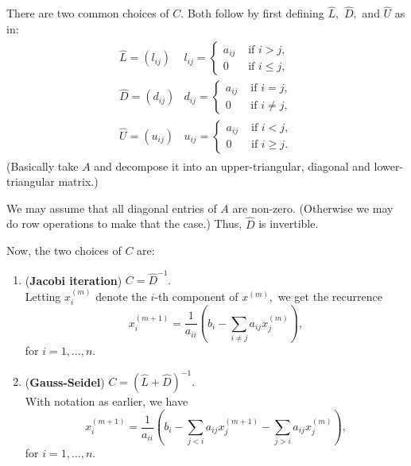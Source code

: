 \documentclass[12pt]{article}
\theoremstyle{definition}
\begin{document}
There are two common choices of $C.$ Both follow by first defining $\hat{L},$ $\hat{D},$ and $\hat{U}$ as in:
\begin{align*} 
	\begin{array}{ll}
		\hat{L} = (l_{ij}) & l_{ij} = \begin{cases}
			a_{ij} & \text{ if } i > j,\\
			0 & \text{ if } i \le j,
		\end{cases}\\
		\hat{D} = (d_{ij}) & d_{ij} = \begin{cases}
			a_{ij} & \text{ if } i = j,\\
			0 & \text{ if } i \neq j,
		\end{cases}\\
		\hat{U} = (u_{ij}) & u_{ij} = \begin{cases}
			a_{ij} & \text{ if } i < j,\\
			0 & \text{ if } i \ge j.
		\end{cases}
	\end{array}
\end{align*}
(Basically take $A$ and decompose it into an upper-triangular, diagonal and lower-triangular matrix.)

We may assume that all diagonal entries of $A$ are non-zero. (Otherwise we may do row operations to make that the case.) Thus, $\hat{D}$ is invertible.

Now, the two choices of $C$ are:
\begin{enumerate}
	\item (\textbf{Jacobi iteration}) $C = \hat{D}^{-1}.$ \\
	Letting $x^{(m)}_i$ denote the $i$-th component of $x^{(m)},$ we get the recurrence
	\begin{equation*} 
		x^{(m + 1)}_i = \frac{1}{a_{ii}}\left(b_i - \displaystyle\sum_{i \neq j}a_{ij}x_j^{(m)}\right),
	\end{equation*}
	for $i = 1, \ldots, n.$

	\item (\textbf{Gauss-Seidel}) $C = (\hat{L} + \hat{D})^{-1}.$ \\
	With notation as earlier, we have
	\begin{equation*} 
		x^{(m + 1)}_i = \frac{1}{a_{ii}}\left(b_i - \displaystyle\sum_{j < i}a_{ij}x^{(m + 1)}_j - \sum_{j > i}a_{ij}x^{(m)}_j\right),
	\end{equation*}
	for $i = 1, \ldots, n.$
\end{enumerate}
\end{document}
